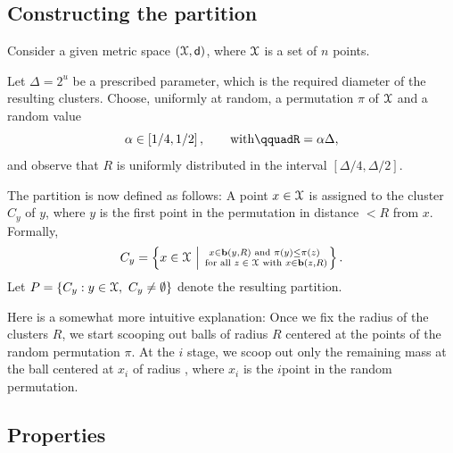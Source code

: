 \subsection{Constructing the partition}

Consider a given metric space $(\FMS, \DistChar)$, where $\FMS$ is a
set of $n$ points.

Let $\Delta = 2^u$ be a prescribed parameter, which is the required
diameter of the resulting clusters.  Choose, uniformly at random, a
permutation $\pi$ of $\FMS$ and a random value
\[
    \alpha \in \pbrcS{\nfrac{1}{4},\nfrac{1}{2}},%
    \qquad\text{with}\qquad%
    R = \alpha \Delta,
\]
and observe that $R$ is uniformly distributed in the interval
$[\Delta/4, \Delta/2]$.

The partition is now defined as follows: A point $x\in \FMS$ is assigned
to the cluster $C_y$ of $y$, where $y$ is the first point in the
permutation in distance $<R$ from $x$. Formally,
\begin{equation*}
C_y = \brc{ x \in \FMS \sep{ \substack{ x \in \Ball(y, R) \textrm { and } \pi(y)
      \leq \pi(z) \\ \textrm{ for all $z \in \FMS$ with } x \in \Ball(z,
      R)}}}.
\end{equation*}
Let $P = \{C_y:y\in\FMS,\ C_y\ne\emptyset\}$ denote the resulting partition.

Here is a somewhat more intuitive explanation: Once we fix the radius
of the clusters $R$, we start scooping out balls of radius $R$
centered at the points of the random permutation $\pi$. At the $i$\th
stage, we scoop out only the remaining mass at the ball centered at
$x_i$ of radius , where $x_i$ is the $i$\th point in the random
permutation.


\subsection{Properties}


